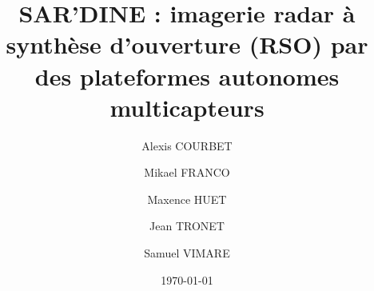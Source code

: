 \documentclass[11pt,a4paper,french]{article}
\begin{document}

		

             

\title{SAR'DINE : imagerie radar à synthèse d'ouverture (RSO) par des plateformes autonomes multicapteurs}


\author{
	Alexis COURBET\and
	Mikael FRANCO\and
	Maxence HUET\and
	Jean TRONET\and
	Samuel VIMARE
}




\date{\today}

\IMTAfrontcover
\pagestyle{IMTAfancy} %
\end{document}
